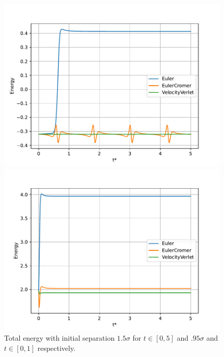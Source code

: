 \documentclass[a4paper,10pt,english]{article}
\begin{document}
\begin{figure}[h]
    \centering
    \begin{minipage}{0.5\textwidth}
        \centering
        \includegraphics[width=1.05\textwidth]{../figures/2_c_iv_15.pdf}
    \end{minipage}\hfill
    \begin{minipage}{0.5\textwidth}
        \centering
        \includegraphics[width=1.05\textwidth]{../figures/2_c_iv_095.pdf}
    \end{minipage}
    \caption{Total energy with initial separation $1.5\sigma$ for $t\in[0, 5]$ and $.95\sigma$ and $t\in[0, 1]$ respectively.}
    \label{fig:energyplots2}
\end{figure}
\end{document}
